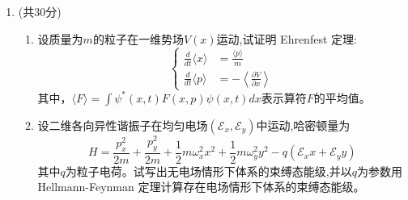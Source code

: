 \begin{enumerate}
\begin{enumerate}
	
	
	
	
	
	
	
\end{enumerate}



\item 
(共30分)
\begin{enumerate}
	\item
设质量为$ m $的粒子在一维势场$ V(x) $运动,试证明  Ehrenfest 定理:
$$\left\{\begin{aligned}
	\frac{d}{d t}\langle x\rangle&=\frac{\langle p\rangle}{m} \\ \frac{d}{d t}\langle p\rangle&=-\left\langle\frac{\partial V}{\partial x}\right\rangle
\end{aligned}\right.$$
其中，$\langle F\rangle=\int \psi^{*}(x, t) F(x, p) \psi(x, t) d x$表示算符$ F $的平均值。

\item 
设二维各向异性谐振子在均匀电场$\left(\mathcal E_{x}, \mathcal E_{y}\right)$中运动,哈密顿量为
$$
H=\frac{p_{x}^{2}}{2 m}+\frac{p_{y}^{2}}{2 m}+\frac{1}{2} m \omega_{x}^{2} x^{2}+\frac{1}{2} m \omega_{y}^{2} y^{2}-q\left(\mathcal{E}_{x} x+\mathcal{E}_{y} y\right)
$$
其中$ q $为粒子电荷。试写出无电场情形下体系的束缚态能级,并以$ q $为参数用
Hellmann-Feynman 定理计算存在电场情形下体系的束缚态能级。





\end{enumerate}
\end{enumerate}
